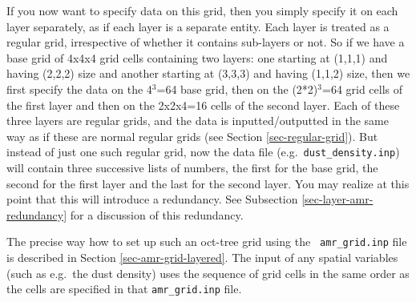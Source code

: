 \documentclass{report}
\begin{document}
If you now want to specify data on this grid, then you simply specify it on
each layer separately, as if each layer is a separate entity. Each layer is
treated as a regular grid, irrespective of whether it contains sub-layers
or not. So if we have a base grid of 4x4x4 grid cells containing two layers:
one starting at (1,1,1) and having (2,2,2) size and another starting at
(3,3,3) and having (1,1,2) size, then we first specify the data on the 
4$^3$=64 base grid, then on the (2*2)$^3$=64 grid cells of the first
layer and then on the 2x2x4=16 cells of the second layer. Each of these
three layers are regular grids, and the data is inputted/outputted in
the same way as if these are normal regular grids (see Section
\ref{sec-regular-grid}). But instead of just one such regular grid, now
the data file (e.g.\ {\small\tt dust\_density.inp}) will contain three
successive lists of numbers, the first for the base grid, the second for
the first layer and the last for the second layer. You may realize at this
point that this will introduce a redundancy. See Subsection
\ref{sec-layer-amr-redundancy} for a discussion of this redundancy.

The precise way how to set up such an oct-tree grid using the {\small\tt
  amr\_grid.inp} file is described in Section \ref{sec-amr-grid-layered}.
The input of any spatial variables (such as e.g.\ the dust density) uses the
sequence of grid cells in the same order as the cells are specified in that
{\small\tt amr\_grid.inp} file. 
\end{document}
